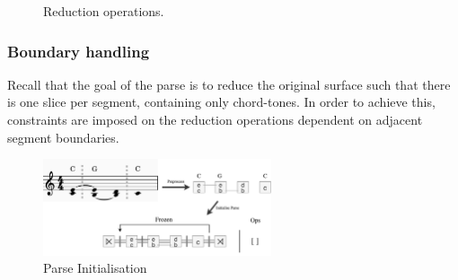 \documentclass[12pt,a4paper,twoside,openright]{report} \usepackage[pdfborder={0 0 0}]{hyperref}    %
\theoremstyle{definition} \newtheorem{definition}{Definition}[section]
\begin{document}
\begin{figure}[h]
  \captionsetup{width=.9\linewidth} \caption{Reduction operations.} \label{fig:evalOps} \end{figure}

%
%
%
%
%
%

  \subsubsection{Boundary handling}

  Recall that the goal of the parse is to reduce the original surface such that there is one slice per segment,
  containing only chord-tones. In order to achieve this, constraints are imposed on the reduction operations dependent
  on adjacent segment boundaries. 

  \begin{figure}[h] \centering \includegraphics[width=0.6\textwidth]{impl/parseInit.png} \caption{Parse Initialisation}
  \label{fig:parseInit} \end{figure}
\end{document}
